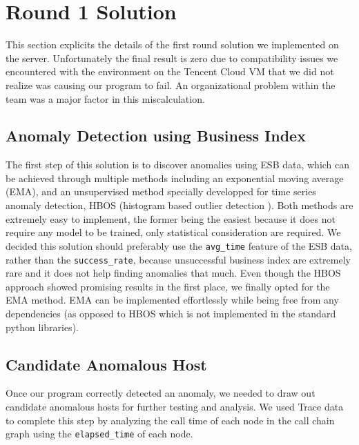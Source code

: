 \documentclass[acmsmall, screen, nonacm]{acmart}
\begin{document}
\section{Round 1 Solution}
This section explicits the details of the first round solution we implemented on the server. 
Unfortunately the final result is zero due to compatibility issues we encountered with the environment on the Tencent Cloud VM that we did not realize was causing our program to fail. 
An organizational problem within the team was a major factor in this miscalculation. 

\subsection{Anomaly Detection using Business Index}
The first step of this solution is to discover anomalies using ESB data, which can be achieved through multiple methods including an exponential moving average (EMA), and an unsupervised method specially developped for time series anomaly detection, HBOS (histogram based outlier detection \cite{goldstein_histogram-based_2012}). 
Both methods are extremely easy to implement, the former being the easiest because it does not require any model to be trained, only statistical consideration are required.
We decided this solution should preferably use the \verb|avg_time| feature of the ESB data, rather than the \verb|success_rate|, because unsuccessful business index are extremely rare and it does not help finding anomalies that much. 
Even though the HBOS approach showed promising results in the first place, we finally opted for the EMA method. 
EMA can be implemented effortlessly while being free from any dependencies (as opposed to HBOS which is not implemented in the standard python libraries).


\subsection{Candidate Anomalous Host}
Once our program correctly detected an anomaly, we needed to draw out candidate anomalous hosts for further testing and analysis. 
We used Trace data to complete this step by analyzing the call time of each node in the call chain graph using the \verb|elapsed_time| of each node. 
\end{document}
